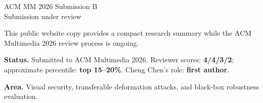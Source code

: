 \documentclass[11pt]{article}
\begin{document}
\begin{center}
{\Large ACM MM 2026 Submission B}\\[0.5em]
{\large Submission under review}
\end{center}

This public website copy provides a compact research summary while the ACM Multimedia 2026 review process is ongoing.

\vspace{0.8em}
\noindent\textbf{Status.} Submitted to ACM Multimedia 2026. Reviewer scores: \textbf{4/4/3/2}; approximate percentile: \textbf{top 15--20\%}. Cheng Chen's role: \textbf{first author}.

\vspace{0.8em}
\noindent\textbf{Area.} Visual security, transferable deformation attacks, and black-box robustness evaluation.
\end{document}
